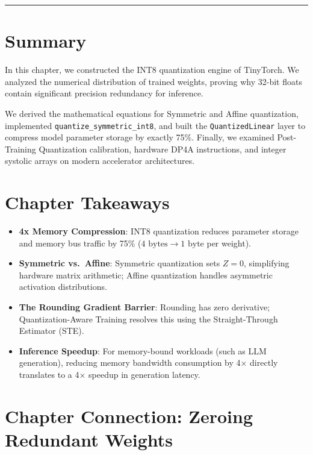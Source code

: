 \documentclass[
  letterpaper,
]{scrbook}
\providecommand{\tightlist}{%
  \setlength{\itemsep}{0pt}\setlength{\parskip}{0pt}}
\begin{document}
\begin{center}\rule{0.5\linewidth}{0.5pt}\end{center}

\section{Summary}\label{summary-15}

In this chapter, we constructed the INT8 quantization engine of
TinyTorch. We analyzed the numerical distribution of trained weights,
proving why 32-bit floats contain significant precision redundancy for
inference.

We derived the mathematical equations for Symmetric and Affine
quantization, implemented \texttt{quantize\_symmetric\_int8}, and built
the \texttt{QuantizedLinear} layer to compress model parameter storage
by exactly 75\%. Finally, we examined Post-Training Quantization
calibration, hardware DP4A instructions, and integer systolic arrays on
modern accelerator architectures.

\section{Chapter Takeaways}\label{chapter-takeaways-15}

\begin{itemize}
\tightlist
\item
  \textbf{4x Memory Compression}: INT8 quantization reduces parameter
  storage and memory bus traffic by 75\%
  (\(4\text{ bytes} \to 1\text{ byte}\) per weight).
\item
  \textbf{Symmetric vs.~Affine}: Symmetric quantization sets \(Z = 0\),
  simplifying hardware matrix arithmetic; Affine quantization handles
  asymmetric activation distributions.
\item
  \textbf{The Rounding Gradient Barrier}: Rounding has zero derivative;
  Quantization-Aware Training resolves this using the Straight-Through
  Estimator (STE).
\item
  \textbf{Inference Speedup}: For memory-bound workloads (such as LLM
  generation), reducing memory bandwidth consumption by 4× directly
  translates to a 4× speedup in generation latency.
\end{itemize}

\section{Chapter Connection: Zeroing Redundant
Weights}\label{chapter-connection-zeroing-redundant-weights}
\end{document}
